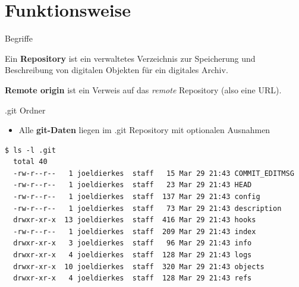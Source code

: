\section{Funktionsweise}

\begin{frame}{Begriffe}
  \begin{Definition}
    Ein \textbf{Repository} ist ein verwaltetes Verzeichnis zur Speicherung und Beschreibung von digitalen Objekten für ein digitales Archiv.\cite{WREP}
  \end{Definition}

  \begin{Definition}
    \textbf{Remote origin} ist ein Verweis auf das \textit{remote} Repository (also eine URL).
  \end{Definition}

\end{frame}

\begin{frame}[fragile]{.git Ordner}
  \begin{itemize}
    \item Alle \textbf{git-Daten} liegen im .git Repository mit optionalen Ausnahmen
  \end{itemize}
  \pause
  \begin{lstlisting}[basicstyle=\tiny]
  $ ls -l .git
  total 40
  -rw-r--r--   1 joeldierkes  staff   15 Mar 29 21:43 COMMIT_EDITMSG
  -rw-r--r--   1 joeldierkes  staff   23 Mar 29 21:43 HEAD
  -rw-r--r--   1 joeldierkes  staff  137 Mar 29 21:43 config
  -rw-r--r--   1 joeldierkes  staff   73 Mar 29 21:43 description
  drwxr-xr-x  13 joeldierkes  staff  416 Mar 29 21:43 hooks
  -rw-r--r--   1 joeldierkes  staff  209 Mar 29 21:43 index
  drwxr-xr-x   3 joeldierkes  staff   96 Mar 29 21:43 info
  drwxr-xr-x   4 joeldierkes  staff  128 Mar 29 21:43 logs
  drwxr-xr-x  10 joeldierkes  staff  320 Mar 29 21:43 objects
  drwxr-xr-x   4 joeldierkes  staff  128 Mar 29 21:43 refs
  \end{lstlisting}

\end{frame}

